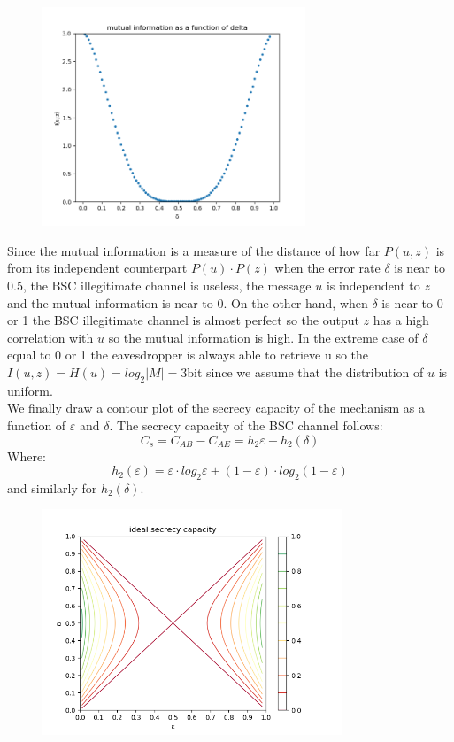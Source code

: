 \documentclass{report}
\begin{document}
\begin{figure}[H]
\centering
\includegraphics[width=0.7\textwidth]{plot3}
\end{figure}

Since the mutual information is a measure of the distance of how far $P(u,z)$ is from its independent  counterpart $P(u)\cdot P(z)$ when the error rate $\delta$ is near to 0.5, the BSC illegitimate channel is useless,  the message $u$ is independent to $z$ and the mutual information is near to 0. On the other hand, when $\delta$ is near to 0 or 1 the BSC illegitimate channel is almost perfect so the output $z$ has a high correlation with $u$ so the mutual information is high. In the extreme case of $\delta$ equal to 0 or 1 the eavesdropper is always able to retrieve u so the $I(u,z)=H(u)=log_2|M|=3$bit since we assume that the distribution of $u$ is uniform.\\
We finally draw a contour plot of the secrecy capacity of the mechanism as a function of $\varepsilon$ and $\delta$. The secrecy capacity of the BSC channel follows: 
\begin{equation*}
C_s=C_{AB}-C_{AE}=h_2{\varepsilon}-h_2(\delta)
\end{equation*}
Where:
\begin{equation*}
h_2(\varepsilon)=\varepsilon\cdot log_2\varepsilon + (1-\varepsilon)\cdot log_2(1-\varepsilon)
\end{equation*}
and similarly for $h_2(\delta)$.

\begin{figure}[H]
\centering
\includegraphics[width=0.8\textwidth]{plot4}
\end{figure}
\end{document}
